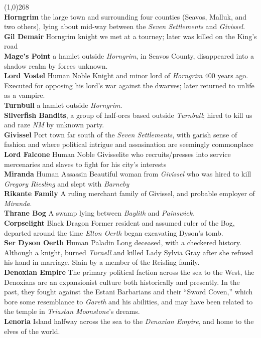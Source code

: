 \documentclass[letterpaper]{article}
\newcommand{\colline}{\noindent\line(1,0){268} \\}
\newcommand{\e}[1]{\emph{#1}}
\newcommand{\B}[1]{\textbf{#1}}
\newenvironment{notesection}[1]
{\noindent {\huge \B{#1}} \par
\vspace{-0.75em}
\colline
\begingroup\fontsize{9pt}{12pt}\selectfont}
{\endgroup}
\newcommand{\person}[3]{\noindent\B{#1
    \ifstrequal{#2}{M}{{\color{ProcessBlue}\male}}{%
    \ifstrequal{#2}{F}{\color{VioletRed}\female}{}}}{\scriptsize #3}}
\begin{document}
\begin{notesection}{People and Places}
\noindent\B{Horngrim} the large town and surrounding four counties (Seavos, Malluk, and two others), lying about mid-way between the \e{Seven Settlements} and \e{Givissel}.\\
\person{Gil Demair} \e{Horngrim} knight we met at a tourney; later was killed on the King's road\\
\noindent\B{Mage's Point} a hamlet outside \e{Horngrim}, in Seavos County, disappeared into a shadow realm by forces unknown.\\
\person{Lord Vostel}{M}{Human Noble} Knight and minor lord of \e{Horngrim} 400 years ago. Executed for opposing his lord's war against the dwarves; later returned to unlife as a vampire.\\
\noindent\B{Turnbull} a hamlet outside \e{Horngrim}.\\
\noindent\B{Silverfish Bandits}, a group of half-orcs based outside \e{Turnbull}; hired to kill us and raze \e{NM} by unknown party.\\

\noindent\B{Givissel} Port town far south of the \e{Seven Settlements}, with garish sense of fashion and where political intrigue and assasination are seemingly commonplace \\
\person{Lord Falcone}{M}{Human Noble} Givisselite who recruits/presses into service mercenaries and slaves to fight for his city's interests\\
\person{Miranda}{F}{Human Assassin} Beautiful woman from \e{Givissel} who was hired to kill \e{Gregory Riesling} and slept with \e{Barneby} \\
\noindent\B{Rikante Family} A ruling merchant family of Givissel, and probable employer of \e{Miranda}.\\

\noindent\B{Thrane Bog} A swamp lying between \e{Baylith} and \e{Painswick}.\\
\person{Corpselight}{F}{Black Dragon} Former resident and assumed ruler of the Bog, departed around the time \e{Elton Oerth} began excavating Dyson's tomb.\\
\person{Ser Dyson Oerth}{M}{Human Paladin} Long deceased, with a checkered history. Although a knight, burned \e{Turnell} and killed Lady Sylvia Gray after she refused his hand in marriage. Slain by a member of the Reisling family.\\

\noindent\B{Denoxian Empire} The primary political faction across the sea to the West, the Denoxians are an expansionist culture both historically and presently. In the past, they fought against the Estani Barbarians and their ``Sword Coven,'' which bore some resemblance to \e{Gareth} and his abilities, and may have been related to the temple in \e{Triastan Moonstone}'s dreams.\\
\noindent\B{Lenoria} Island halfway across the sea to the \e{Denoxian Empire}, and home to the elves of the world.\\
\end{notesection}
\end{document}
